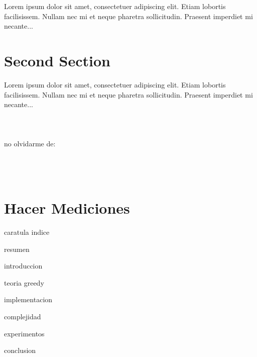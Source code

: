 Lorem ipsum dolor sit amet, consectetuer adipiscing elit.  
Etiam lobortis facilisissem.  Nullam nec mi et neque pharetra 
sollicitudin.  Praesent imperdiet mi necante...

\section*{Second Section}
       
Lorem ipsum dolor sit amet, consectetuer adipiscing elit.  
Etiam lobortis facilisissem.  Nullam nec mi et neque pharetra 
sollicitudin.  Praesent imperdiet mi necante... \\\\\\\\








no olvidarme de: \\\\\\\\

\section*{Hacer Mediciones}

caratula
indice

resumen

introduccion

teoria greedy

implementacion

complejidad

experimentos

conclusion

